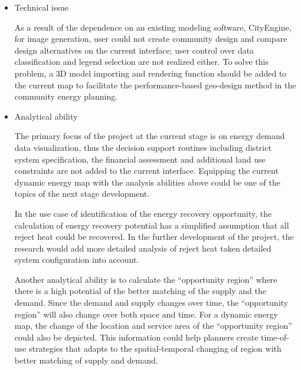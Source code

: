 \begin{itemize}
\item Technical issue

  As a result of the dependence on an existing modeling software,
  CityEngine, for image generation, user could not create community
  design and compare design alternatives on the current interface;
  user control over data classification and legend selection are not
  realized either. To solve this problem, a 3D model importing and
  rendering function should be added to the current map to facilitate
  the performance-based geo-design method in the community energy
  planning.

\item Analytical ability

  The primary focus of the project at the current stage is on energy
  demand data visualization, thus the decision support routines
  including district system specification, the financial assessment
  and additional land use constraints are not added to the current
  interface. Equipping the current dynamic energy map with the
  analysis abilities above could be one of the topics of the next
  stage development.
  
  In the use case of identification of the energy recovery
  opportunity, the calculation of energy recovery potential has a
  simplified assumption that all reject heat could be recovered.  In
  the further development of the project, the research would add more
  detailed analysis of reject heat taken detailed system configuration
  into account.
  
  Another analytical ability is to calculate the ``opportunity
  region'' where there is a high potential of the better matching of
  the supply and the demand. Since the demand and supply changes over
  time, the ``opportunity region'' will also change over both space
  and time. For a dynamic energy map, the change of the location and
  service area of the ``opportunity region'' could also be
  depicted. This information could help planners create time-of-use
  strategies that adapts to the spatial-temporal changing of region
  with better matching of supply and demand.
  

\end{itemize}
